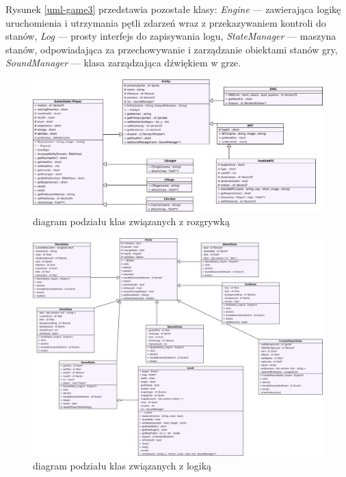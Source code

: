 \documentclass[10pt,a4paper]{article}
\begin{document}
Rysunek \ref{uml-game3} przedstawia pozostałe klasy: \textit{Engine} --- zawierająca logikę uruchomienia i utrzymania pętli zdarzeń wraz z przekazywaniem kontroli do stanów, \textit{Log} --- prosty interfejs do zapisywania logu, \textit{StateManager} --- maszyna stanów, odpowiadająca za przechowywanie i zarządzanie obiektami stanów gry, \textit{SoundManager} --- klasa zarządzająca dźwiękiem w grze.

\begin{figure}
    \centering
    \includegraphics[width=\textwidth]{uml/class1.pdf}
    \caption{diagram podziału klas związanych z rozgrywką}
    \label{uml-game}
\end{figure}

\begin{figure}
    \centering
    \includegraphics[width=\textwidth]{uml/class2.pdf}
    \caption{diagram podziału klas związanych z logiką}
    \label{uml-game2}
\end{figure}
\end{document}
